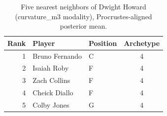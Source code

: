 \begin{table}[htbp]
  \centering\small
  \begin{tabular}{rllc}
    \toprule
    Rank & Player & Position & Archetype \\
    \midrule
    1 & Bruno Fernando & C & 4 \\
    2 & Isaiah Roby & F & 4 \\
    3 & Zach Collins & F & 4 \\
    4 & Cheick Diallo & F & 4 \\
    5 & Colby Jones & G & 4 \\
    \bottomrule
  \end{tabular}
  \caption{Five nearest neighbors of Dwight Howard (curvature_m3 modality), Procrustes-aligned posterior mean.}
  \label{tab:Dwight_Howard_neighbors_curvature_m3}
\end{table}

